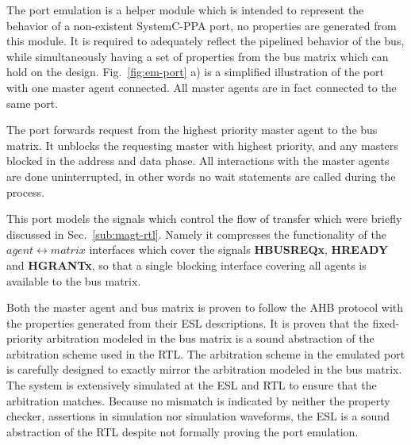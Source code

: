 The port emulation is a helper module which is intended to represent the behavior of a non-existent SystemC-PPA port, no properties are generated from this module. It is required to adequately reflect the pipelined behavior of the bus, while simultaneously having a set of properties from the bus matrix which can hold on the design. Fig.~\ref{fig:em-port} a) is a simplified illustration of the port with one master agent connected. All master agents are in fact connected to the same port. \par
The port forwards request from the highest priority master agent to the bus matrix. It unblocks the requesting master with highest priority, and any masters blocked in the address and data phase. All interactions with the master agents are done uninterrupted, in other words no wait statements are called during the process. \par
This port models the signals which control the flow of transfer which were briefly discussed in Sec.~\ref{sub:magt-rtl}. Namely it compresses the functionality of the $agent\leftrightarrow matrix$ interfaces which cover the signals \textbf{HBUSREQx}, \textbf{HREADY} and \textbf{HGRANTx}, so that a single blocking interface covering all agents is available to the bus matrix. \par
Both the master agent and bus matrix is proven to follow the AHB protocol with the properties generated from their ESL descriptions. It is proven that the fixed-priority arbitration modeled in the bus matrix is a sound abstraction of the arbitration scheme used in the RTL. The arbitration scheme in the emulated port is carefully designed to exactly mirror the arbitration modeled in the bus matrix. The system is extensively simulated at the ESL and RTL to ensure that the arbitration matches. Because no mismatch is indicated by neither the property checker, assertions in simulation nor simulation waveforms, the ESL is a sound abstraction of the RTL despite not formally proving the port emulation.  





